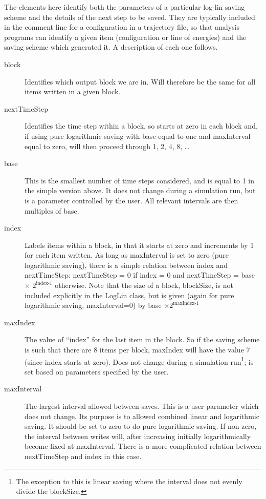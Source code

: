 \documentclass[a4paper]{article}
\begin{document}
The elements here identify both the parameters of a particular log-lin saving
scheme and the details of the next step to be saved. They are typically 
included in the comment line for a configuration in a trajectory file,
so that analysis programs can identify a given item  (configuration or 
line of energies) and the saving scheme which generated it. A description of
each one follows.

\begin{description}
\item[block] Identifies which output block we are in. Will therefore be the same
for all items written in a given block.
\item[nextTimeStep] Identifies the time step within a block, so starts at zero
in each block and, if using pure logarithmic saving with base equal to one and
maxInterval equal to zero, will then proceed
through 1, 2, 4, 8, \ldots
\item[base] This is the smallest number of time steps considered, and is equal
to 1 in the simple version above. It does not change during a simulation run,
but is a parameter controlled by the user. All relevant intervals are then
multiples of base.
\item[index] Labels items within a block, in that it starts at zero and 
increments by 1 for each item written. As long as maxInterval is set to zero
(pure logarithmic saving), there is a simple relation between index and 
nextTimeStep: nextTimeStep = 0 if index = 0 and nextTimeStep = 
base $\times$ $2^{\textrm{index-1}}$ otherwise. Note that the size of a block, 
blockSize, is not included explicitly in the LogLin class, but is given
(again for pure logarithmic saving, maxInterval=0) by 
base $\times 2^{\textrm{maxIndex-1}}$ 
\item[maxIndex] The value of ``index'' for the last item in the block. So if
the saving scheme is such that there are 8 items per block, maxIndex will have
the value 7 (since index starts at zero). Does not change during a simulation
run\footnote{The exception to this is linear saving where the interval does not evenly divide the blockSize.}; is set based on parameters specified by the user.
\item[maxInterval] The largest interval allowed between saves. This is a user
parameter which does not change. Its purpose is to allowed combined linear and
logarithmic saving. It should be set to zero to do pure logarithmic saving.
If non-zero, the interval between writes will, after increasing initially
logarithmically become fixed at maxInterval. There is a more complicated 
relation between nextTimeStep and index in this case.
\end{description}
\end{document}
